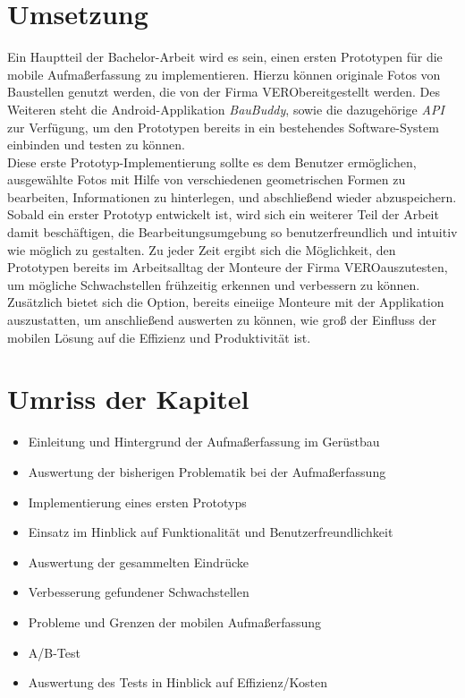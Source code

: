 \documentclass[a4paper]{article}
\newcommand{\vero}{\textsc{VERO}}
\begin{document}
\section*{Umsetzung}
Ein Hauptteil der Bachelor-Arbeit wird es sein, einen ersten Prototypen für die mobile Aufmaßerfassung zu implementieren.
Hierzu können originale Fotos von Baustellen genutzt werden, die von der Firma \vero  bereitgestellt werden.
Des Weiteren steht die Android-Applikation \textit{BauBuddy}, sowie die dazugehörige \textit{API} zur Verfügung, um den Prototypen bereits in ein bestehendes Software-System einbinden und testen zu können. \\
Diese erste Prototyp-Implementierung sollte es dem Benutzer ermöglichen, ausgewählte Fotos mit Hilfe von verschiedenen geometrischen Formen zu bearbeiten, Informationen zu hinterlegen, und abschließend wieder abzuspeichern.
Sobald ein erster Prototyp entwickelt ist, wird sich ein weiterer Teil der Arbeit damit beschäftigen, die Bearbeitungsumgebung so benutzerfreundlich und intuitiv wie möglich zu gestalten.
Zu jeder Zeit ergibt sich die Möglichkeit, den Prototypen bereits im Arbeitsalltag der Monteure der Firma \vero auszutesten, um mögliche Schwachstellen frühzeitig erkennen und verbessern zu können.
Zusätzlich bietet sich die Option, bereits eineiige Monteure mit der Applikation auszustatten, um anschließend auswerten zu können, wie groß der Einfluss der mobilen Lösung auf die Effizienz und Produktivität ist.

\section*{Umriss der Kapitel}
\begin{itemize}
	\item Einleitung und Hintergrund der Aufmaßerfassung im Gerüstbau
	\item Auswertung der bisherigen Problematik bei der Aufmaßerfassung
	\item Implementierung eines ersten Prototyps
	\item Einsatz im Hinblick auf Funktionalität und Benutzerfreundlichkeit
	\item Auswertung der gesammelten Eindrücke
	\item Verbesserung gefundener Schwachstellen
	\item Probleme und Grenzen der mobilen Aufmaßerfassung
	\item A/B-Test
	\item Auswertung des Tests in Hinblick auf Effizienz/Kosten
\end{itemize}
\end{document}
